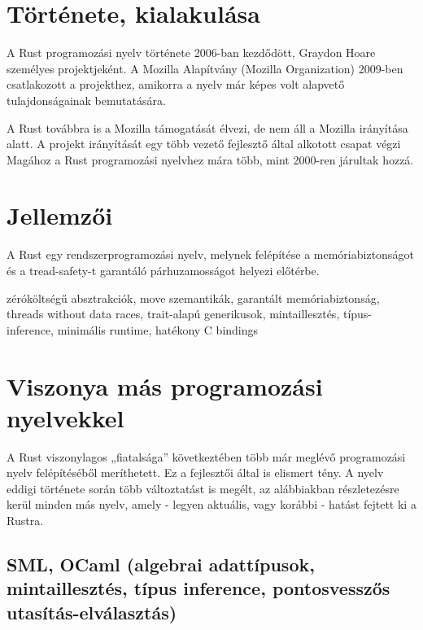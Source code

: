 
\section{Története, kialakulása}
A Rust programozási nyelv története 2006-ban kezdődött, Graydon Hoare személyes projektjeként. A Mozilla Alapítvány (Mozilla Organization) 2009-ben csatlakozott a projekthez, amikorra a nyelv már képes volt alapvető tulajdonságainak bemutatására. %

A Rust továbbra is a Mozilla támogatását élvezi, de nem áll a Mozilla irányítása alatt. A projekt irányítását egy több vezető fejlesztő által alkotott csapat végzi %
Magához a Rust programozási nyelvhez mára több, mint 2000-ren járultak hozzá. %

\section{Jellemzői}
A Rust egy rendszerprogramozási nyelv, melynek felépítése a memóriabiztonságot és a tread-safety-t garantáló párhuzamosságot helyezi előtérbe.

zéróköltségű absztrakciók, move szemantikák, garantált memóriabiztonság, threads without data races, trait-alapú generikusok, mintaillesztés, típus-inference, minimális runtime, hatékony C bindings

\section{Viszonya más programozási nyelvekkel}
A Rust viszonylagos „fiatalsága” következtében több már meglévő programozási nyelv felépítéséből meríthetett. Ez a fejlesztői által is elismert %
tény. A nyelv eddigi története során több változtatást is megélt, az alábbiakban részletezésre kerül minden más nyelv, amely - legyen aktuális, vagy korábbi - hatást fejtett ki a Rustra.

\subsection{SML, OCaml (algebrai adattípusok, mintaillesztés, típus inference, pontosvesszős utasítás-elválasztás)}

